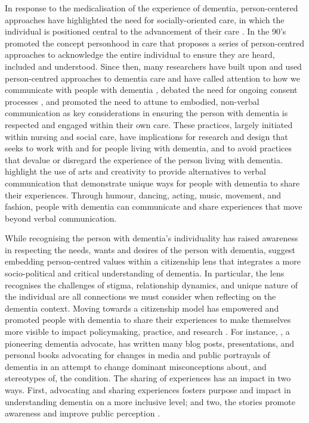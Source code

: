 In response to the medicalisation of the experience of dementia, person-centered approaches have highlighted the need for socially-oriented care, in which the individual is positioned central to the advancement of their care \citep{bond_medicalization_1992,manthorpe_person-centered_2016}. In the 90's \cite{kitwood_towards_1992} promoted the concept personhood in care that proposes a series of person-centred approaches to acknowledge the entire individual to ensure they are heard, included and understood. Since then, many researchers have built upon and used person-centred approaches to dementia care and have called attention to how we communicate with people with dementia \citep{oyebode_mental_2005}, debated the need for ongoing consent processes \citep{dewing_participatory_2007}, and promoted the need to attune to embodied, non-verbal communication \citep{group_patron_2019, twigg_dress_2013} as key considerations in ensuring the person with dementia is respected and engaged within their own care. These practices, largely initiated within nursing and social care, have implications for research and design that seeks to work with and for people living with dementia, and to avoid practices that devalue or disregard the experience of the person living with dementia. \cite{john_killick_claire_craig_creativity_2012} highlight the use of arts and creativity to provide alternatives to verbal communication that demonstrate unique ways for people with dementia to share their experiences. Through humour, dancing, acting, music, movement, and fashion, people with dementia can communicate and share experiences that move beyond verbal communication.

While recognising the person with dementia's individuality has raised awareness in respecting the needs, wants and desires of the person with dementia, \cite{bartlett_personhood_2007} suggest embedding person-centred values within a citizenship lens that integrates a more socio-political and critical understanding of dementia. In particular, the lens recognises the challenges of stigma, relationship dynamics, and unique nature of the individual are all connections we must consider when reflecting on the dementia context. Moving towards a citizenship model has empowered and promoted people with dementia to share their experiences to make themselves more visible to impact policymaking, practice, and research \citep{weetch_involvement_2020}. For instance, \cite{bryden_challenging_2020}, a pioneering dementia advocate, has written many blog posts, presentations, and personal books advocating for changes in media and public portrayals of dementia in an attempt to change dominant misconceptions about, and stereotypes of, the condition. The sharing of experiences has an impact in two ways. First, advocating and sharing experiences fosters purpose and impact in understanding dementia on a more inclusive level; and two, the stories promote awareness and improve public perception \citep{reynolds2017stigma}.

